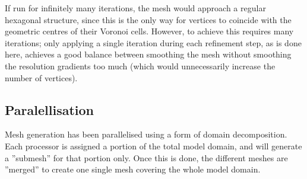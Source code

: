 \documentclass{article}
\begin{document}
If run for infinitely many iterations, the mesh would approach a regular hexagonal structure, since this is the only way for vertices to coincide with the geometric centres of their Voronoi cells. However, to achieve this requires many iterations; only applying a single iteration during each refinement step, as is done here, achieves a good balance between smoothing the mesh without smoothing the resolution gradients too much (which would unnecessarily increase the number of vertices).

\newpage
\subsection{Paralellisation}

Mesh generation has been parallelised using a form of domain decomposition. Each processor is assigned a portion of the total model domain, and will generate a ''submesh'' for that portion only. Once this is done, the different meshes are ''merged'' to create one single mesh covering the whole model domain.
\end{document}

